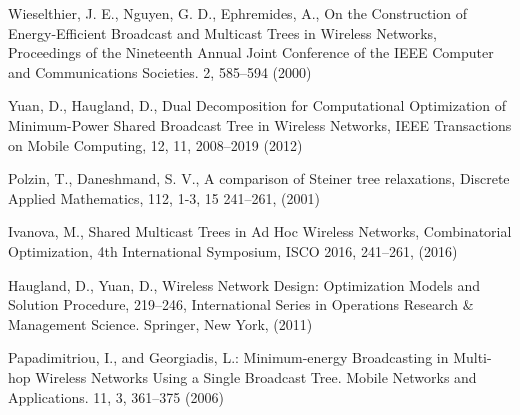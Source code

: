 \begin{thebibliography}{}

%
%
Wieselthier,  J. E., Nguyen, G. D., Ephremides, A.,
On the Construction of Energy-Efficient Broadcast and Multicast Trees in Wireless Networks,
Proceedings of the Nineteenth Annual Joint Conference of the IEEE Computer and Communications Societies.
2, 585--594 (2000)

Yuan, D., Haugland, D.,
Dual Decomposition for Computational Optimization of Minimum-Power Shared Broadcast Tree in Wireless Networks,
IEEE Transactions on Mobile Computing,
12, 11, 2008--2019 (2012)

Polzin, T., Daneshmand, S. V., A comparison of Steiner tree relaxations, Discrete Applied Mathematics, 112,  1-3, 15 241--261, (2001)

Ivanova, M., Shared Multicast Trees in Ad Hoc Wireless Networks, Combinatorial Optimization, 4th International Symposium, ISCO 2016, 241--261, (2016)

Haugland, D., Yuan, D.,
Wireless Network Design: Optimization Models and Solution Procedure, 219--246,
International Series in Operations Research \& Management Science.
Springer, New York, (2011)

Papadimitriou, I., and Georgiadis, L.:
Minimum-energy Broadcasting in Multi-hop Wireless Networks Using a Single Broadcast Tree.
Mobile Networks and Applications.
11, 3, 361--375 (2006)

\end{thebibliography}
\newpage

